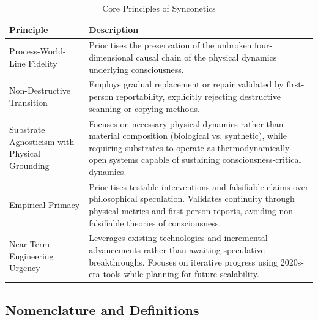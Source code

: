 \documentclass[10pt]{article}
\begin{document}
\begin{sloppypar}
  \begin{table}[ht!]
    \centering
    \begin{tabular}{p{}p{}}
      \toprule
      \textbf{Principle}                            & \textbf{Description}                                                                                                                                                                                                               \\
      \midrule
      Process-World-Line Fidelity                   & Prioritises the preservation of the unbroken four-dimensional causal chain of the physical dynamics underlying consciousness.                                                                                                      \\
      \midrule
      Non-Destructive Transition                    & Employs gradual replacement or repair validated by first-person reportability, explicitly rejecting destructive scanning or copying methods.                                                                                       \\
      \midrule
      Substrate Agnosticism with Physical Grounding & Focuses on necessary physical dynamics rather than material composition (biological vs. synthetic), while requiring substrates to operate as thermodynamically open systems capable of sustaining consciousness-critical dynamics. \\
      \midrule
      Empirical Primacy                             & Prioritises testable interventions and falsifiable claims over philosophical speculation. Validates continuity through physical metrics and first-person reports, avoiding non-falsifiable theories of consciousness.              \\
      \midrule
      Near-Term Engineering Urgency                 & Leverages existing technologies and incremental advancements rather than awaiting speculative breakthroughs. Focuses on iterative progress using 2020s-era tools while planning for future scalability.                            \\
      \bottomrule
    \end{tabular}
    \caption{Core Principles of Synconetics}
    \label{tab:synconetics-principles}
  \end{table}

  \subsection{Nomenclature and Definitions}
  \label{sec:nomenclature}


\end{sloppypar}
\end{document}
